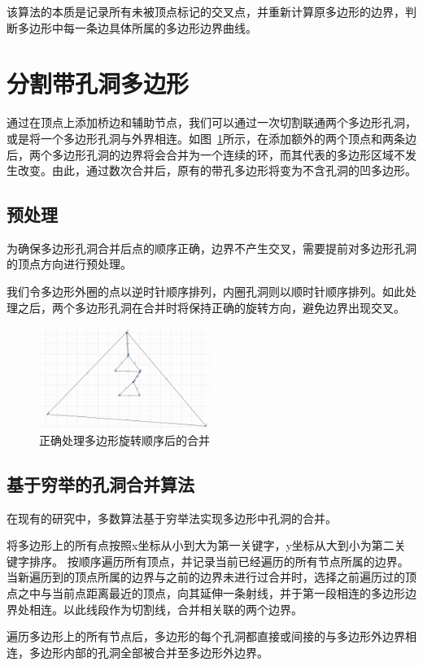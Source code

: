 该算法的本质是记录所有未被顶点标记的交叉点，并重新计算原多边形的边界，判断多边形中每一条边具体所属的多边形边界曲线。
\section{分割带孔洞多边形}
通过在顶点上添加桥边和辅助节点，我们可以通过一次切割联通两个多边形孔洞，或是将一个多边形孔洞与外界相连。如图~\ref*{merge}所示，在添加额外的两个顶点和两条边后，两个多边形孔洞的边界将会合并为一个连续的环，而其代表的多边形区域不发生改变。由此，通过数次合并后，原有的带孔多边形将变为不含孔洞的凹多边形。
\subsection{预处理}
为确保多边形孔洞合并后点的顺序正确，边界不产生交叉，需要提前对多边形孔洞的顶点方向进行预处理。

我们令多边形外圈的点以逆时针顺序排列，内圈孔洞则以顺时针顺序排列。如此处理之后，两个多边形孔洞在合并时将保持正确的旋转方向，避免边界出现交叉。

\begin{figure}[htp]
    \centering
    \includegraphics[width=0.5\textwidth]
    {figures/mergehole.png}
    \caption{正确处理多边形旋转顺序后的合并}
    \label{merge}
  \end{figure}

\subsection{基于穷举的孔洞合并算法}
在现有的研究中，多数算法基于穷举法实现多边形中孔洞的合并。

将多边形上的所有点按照x坐标从小到大为第一关键字，y坐标从大到小为第二关键字排序。
按顺序遍历所有顶点，并记录当前已经遍历的所有节点所属的边界。
当新遍历到的顶点所属的边界与之前的边界未进行过合并时，选择之前遍历过的顶点之中与当前点距离最近的顶点，向其延伸一条射线，并于第一段相连的多边形边界处相连。以此线段作为切割线，合并相关联的两个边界。

遍历多边形上的所有节点后，多边形的每个孔洞都直接或间接的与多边形外边界相连，多边形内部的孔洞全部被合并至多边形外边界。
